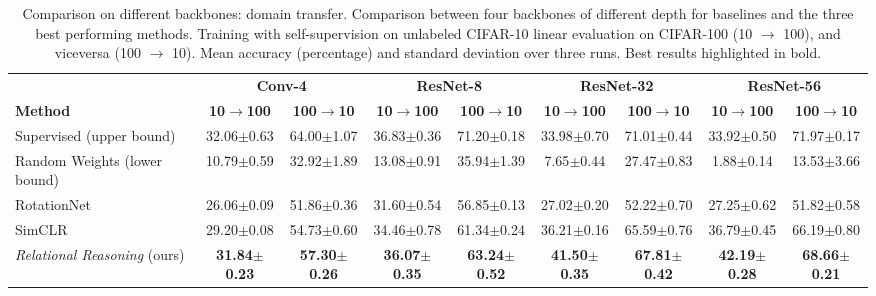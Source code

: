 \documentclass{article}
\begin{document}
\begin{table}[H]
 \caption{Comparison on different backbones: domain transfer. Comparison between four backbones of different depth for baselines and the three best performing methods. Training with self-supervision on unlabeled CIFAR-10 linear evaluation on CIFAR-100 (10 $\rightarrow$ 100), and viceversa (100 $\rightarrow$ 10). Mean accuracy (percentage) and standard deviation over three runs. Best results highlighted in bold.}
 \label{tab:backbones_domain_transfer}
 \begin{adjustbox}{width=1.0\columnwidth,center}
  \centering
  \begin{tabular}{lcccccccc}
    \toprule
     & \multicolumn{2}{c}{\textbf{Conv-4}} & \multicolumn{2}{c}{\textbf{ResNet-8}} & \multicolumn{2}{c}{\textbf{ResNet-32}} & \multicolumn{2}{c}{\textbf{ResNet-56}}\\
    \cmidrule[0.1pt](r){2-3} \cmidrule[0.1pt](l){4-5} \cmidrule[0.1pt](l){6-7} \cmidrule[0.1pt](l){8-9}
    \textbf{Method} &
    \textbf{10$\rightarrow$100} & \textbf{100$\rightarrow$10} &
    \textbf{10$\rightarrow$100} & \textbf{100$\rightarrow$10} &
    \textbf{10$\rightarrow$100} & \textbf{100$\rightarrow$10} &
    \textbf{10$\rightarrow$100} & \textbf{100$\rightarrow$10} \\
    \midrule
    Supervised (upper bound) & 
    32.06$\pm$\small{0.63} & 64.00$\pm$\small{1.07} & 
    36.83$\pm$\small{0.36} & 71.20$\pm$\small{0.18} & 
    33.98$\pm$\small{0.70} & 71.01$\pm$\small{0.44} & 
    33.92$\pm$\small{0.50} & 71.97$\pm$\small{0.17} \\
    Random Weights (lower bound) & 
    10.79$\pm$\small{0.59} & 32.92$\pm$\small{1.89} & 
    13.08$\pm$\small{0.91} & 35.94$\pm$\small{1.39} & 
     7.65$\pm$\small{0.44} & 27.47$\pm$\small{0.83} &  
     1.88$\pm$\small{0.14} & 13.53$\pm$\small{3.66} \\
    \cmidrule(l){1-9}
    RotationNet \citep{gidaris2018unsupervised} & 
    26.06$\pm$\small{0.09} & 51.86$\pm$\small{0.36} & 
    31.60$\pm$\small{0.54} & 56.85$\pm$\small{0.13} & 
    27.02$\pm$\small{0.20} & 52.22$\pm$\small{0.70} & 
    27.25$\pm$\small{0.62} & 51.82$\pm$\small{0.58} \\
    SimCLR \citep{chen2020simple} & 
    29.20$\pm$\small{0.08} & 54.73$\pm$\small{0.60} & 
    34.46$\pm$\small{0.78} & 61.34$\pm$\small{0.24} & 
    36.21$\pm$\small{0.16} & 65.59$\pm$\small{0.76} & 
    36.79$\pm$\small{0.45} & 66.19$\pm$\small{0.80} \\    
    \emph{Relational Reasoning} (ours) & 
    \textbf{31.84$\pm$\small{0.23}} & \textbf{57.30$\pm$\small{0.26}} & 
    \textbf{36.07$\pm$\small{0.35}} & \textbf{63.24$\pm$\small{0.52}} & 
    \textbf{41.50$\pm$\small{0.35}} & \textbf{67.81$\pm$\small{0.42}} & 
    \textbf{42.19$\pm$\small{0.28}} & \textbf{68.66$\pm$\small{0.21}} \\
    \bottomrule
  \end{tabular}
 \end{adjustbox}
\end{table}
\end{document}
